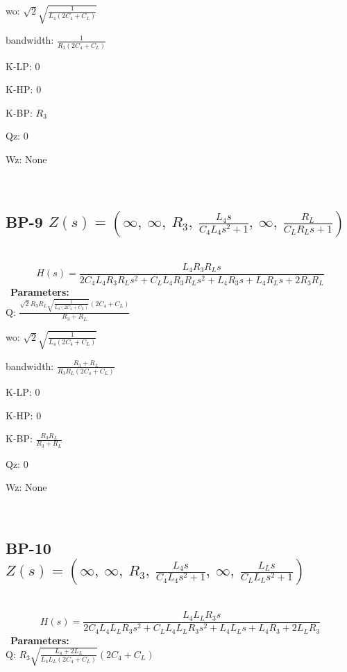 \documentclass{article}
\begin{document}
wo: $\sqrt{2} \sqrt{\frac{1}{L_{4} \left(2 C_{4} + C_{L}\right)}}$\ 

bandwidth: $\frac{1}{R_{3} \left(2 C_{4} + C_{L}\right)}$\ 

K-LP: $0$\ 

K-HP: $0$\ 

K-BP: $R_{3}$\ 

Qz: $0$\ 

Wz: $\text{None}$\ 

\ 

\subsection{BP-9 $Z(s) = \left( \infty, \  \infty, \  R_{3}, \  \frac{L_{4} s}{C_{4} L_{4} s^{2} + 1}, \  \infty, \  \frac{R_{L}}{C_{L} R_{L} s + 1}\right)$ } \ 
\textbf{\[H(s) = \frac{L_{4} R_{3} R_{L} s}{2 C_{4} L_{4} R_{3} R_{L} s^{2} + C_{L} L_{4} R_{3} R_{L} s^{2} + L_{4} R_{3} s + L_{4} R_{L} s + 2 R_{3} R_{L}}\] } \ 
\textbf{Parameters:}\\ 

Q: $\frac{\sqrt{2} R_{3} R_{L} \sqrt{\frac{1}{L_{4} \left(2 C_{4} + C_{L}\right)}} \left(2 C_{4} + C_{L}\right)}{R_{3} + R_{L}}$\ 

wo: $\sqrt{2} \sqrt{\frac{1}{L_{4} \left(2 C_{4} + C_{L}\right)}}$\ 

bandwidth: $\frac{R_{3} + R_{L}}{R_{3} R_{L} \left(2 C_{4} + C_{L}\right)}$\ 

K-LP: $0$\ 

K-HP: $0$\ 

K-BP: $\frac{R_{3} R_{L}}{R_{3} + R_{L}}$\ 

Qz: $0$\ 

Wz: $\text{None}$\ 

\ 

\subsection{BP-10 $Z(s) = \left( \infty, \  \infty, \  R_{3}, \  \frac{L_{4} s}{C_{4} L_{4} s^{2} + 1}, \  \infty, \  \frac{L_{L} s}{C_{L} L_{L} s^{2} + 1}\right)$ } \ 
\textbf{\[H(s) = \frac{L_{4} L_{L} R_{3} s}{2 C_{4} L_{4} L_{L} R_{3} s^{2} + C_{L} L_{4} L_{L} R_{3} s^{2} + L_{4} L_{L} s + L_{4} R_{3} + 2 L_{L} R_{3}}\] } \ 
\textbf{Parameters:}\\ 

Q: $R_{3} \sqrt{\frac{L_{4} + 2 L_{L}}{L_{4} L_{L} \left(2 C_{4} + C_{L}\right)}} \left(2 C_{4} + C_{L}\right)$\ 
\end{document}
